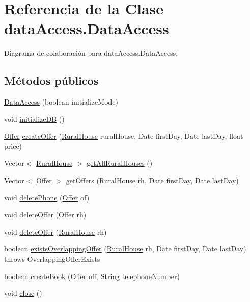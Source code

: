 \hypertarget{classdata_access_1_1_data_access}{}\section{Referencia de la Clase data\+Access.\+Data\+Access}
\label{classdata_access_1_1_data_access}


Diagrama de colaboración para data\+Access.\+Data\+Access\+:
\subsection*{Métodos públicos}
\begin{DoxyCompactItemize}
\item 
\mbox{\hyperlink{classdata_access_1_1_data_access_a7999ee5a7ac4f0295bd0b7764e4f57cf}{Data\+Access}} (boolean initialize\+Mode)
\item 
void \mbox{\hyperlink{classdata_access_1_1_data_access_ab0490e80b8f3400fe2d8817abcf058c4}{initialize\+DB}} ()
\item 
\mbox{\hyperlink{classdomain_1_1_offer}{Offer}} \mbox{\hyperlink{classdata_access_1_1_data_access_ac07343daf9aa06679c7b28c082950ab0}{create\+Offer}} (\mbox{\hyperlink{classdomain_1_1_rural_house}{Rural\+House}} rural\+House, Date first\+Day, Date last\+Day, float price)
\item 
Vector$<$ \mbox{\hyperlink{classdomain_1_1_rural_house}{Rural\+House}} $>$ \mbox{\hyperlink{classdata_access_1_1_data_access_a13b08775ff3b4b3859a7772de6592fb0}{get\+All\+Rural\+Houses}} ()
\item 
Vector$<$ \mbox{\hyperlink{classdomain_1_1_offer}{Offer}} $>$ \mbox{\hyperlink{classdata_access_1_1_data_access_ab8f58c04c48032a83b000d6de7f47d4e}{get\+Offers}} (\mbox{\hyperlink{classdomain_1_1_rural_house}{Rural\+House}} rh, Date first\+Day, Date last\+Day)
\item 
void \mbox{\hyperlink{classdata_access_1_1_data_access_abd8f84251ff66d5376775b2740bdc46b}{delete\+Phone}} (\mbox{\hyperlink{classdomain_1_1_offer}{Offer}} of)
\item 
void \mbox{\hyperlink{classdata_access_1_1_data_access_aa9afd19a1ccbde5244a13b7893ea534f}{delete\+Offer}} (\mbox{\hyperlink{classdomain_1_1_offer}{Offer}} rh)
\item 
void \mbox{\hyperlink{classdata_access_1_1_data_access_ace8c90c27e0e185f25571244c4092d5e}{delete\+Offer}} (\mbox{\hyperlink{classdomain_1_1_rural_house}{Rural\+House}} rh)
\item 
boolean \mbox{\hyperlink{classdata_access_1_1_data_access_ab6b1332b8bb17a4f65457043247d0b5e}{exists\+Overlapping\+Offer}} (\mbox{\hyperlink{classdomain_1_1_rural_house}{Rural\+House}} rh, Date first\+Day, Date last\+Day)  throws Overlapping\+Offer\+Exists
\item 
boolean \mbox{\hyperlink{classdata_access_1_1_data_access_a85fbdae5765eaacaadd42eb0e509aa9e}{create\+Book}} (\mbox{\hyperlink{classdomain_1_1_offer}{Offer}} off, String telephone\+Number)
\item 
void \mbox{\hyperlink{classdata_access_1_1_data_access_a58d3d443d0a2f5d74b6240248a257fd5}{close}} ()
\end{DoxyCompactItemize}
